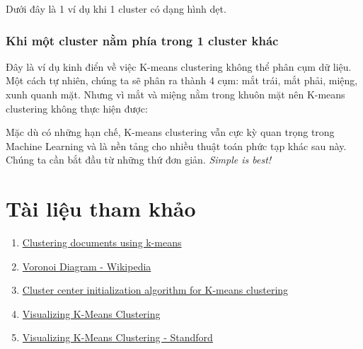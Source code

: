 Dưới đây là 1 ví dụ khi 1 cluster có dạng hình dẹt.  
 
 
 
\subsubsection{Khi một cluster nằm phía trong 1 cluster khác}
 Đây là ví dụ kinh điển về việc K-means clustering không thể phân cụm dữ liệu. Một cách tự nhiên, chúng ta sẽ phân ra thành 4 cụm: mắt trái, mắt phải, miệng, xunh quanh mặt. Nhưng vì mắt và miệng nằm trong khuôn mặt nên K-means clustering không thực hiện được: 
 
 
 
Mặc dù có những hạn chế, K-means clustering vẫn cực kỳ quan trọng trong Machine Learning và là nền tảng cho nhiều thuật toán phức tạp khác sau này. Chúng ta cần bắt đầu từ những thứ đơn giản. \textit{Simple is best!} 
 
 
 
\section{Tài liệu tham khảo}

\begin{enumerate}
	\item \href{http://scikit-learn.org/stable/auto_examples/text/document_clustering.html}{Clustering documents using k-means}

	\item \href{https://en.wikipedia.org/wiki/Voronoi_diagram}{Voronoi Diagram - Wikipedia}

	\item \href{http://www.sciencedirect.com/science/article/pii/S0167865504000996}{Cluster center initialization algorithm for K-means clustering}

	\item \href{https://www.naftaliharris.com/blog/visualizing-k-means-clustering/}{Visualizing K-Means Clustering}

	\item \href{http://stanford.edu/class/ee103/visualizations/kmeans/kmeans.html}{Visualizing K-Means Clustering - Standford}
 
\end{enumerate}
 
